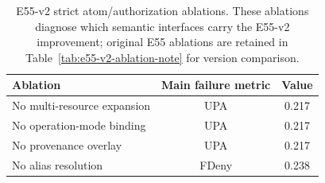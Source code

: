\begin{table}[t]
\centering
\small
\caption{E55-v2 strict atom/authorization ablations. These ablations diagnose which semantic interfaces carry the E55-v2 improvement; original E55 ablations are retained in Table~\ref{tab:e55-v2-ablation-note} for version comparison.}
\label{tab:ablation}
\begin{tabular}{lcc}
\toprule
Ablation & Main failure metric & Value \\
\midrule
No multi-resource expansion & UPA & 0.217 \\
No operation-mode binding & UPA & 0.217 \\
No provenance overlay & UPA & 0.217 \\
No alias resolution & FDeny & 0.238 \\
\bottomrule
\end{tabular}
\end{table}
